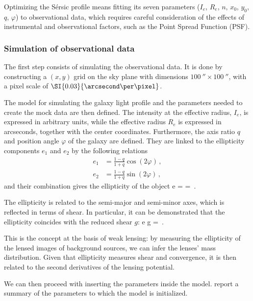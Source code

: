 Optimizing the Sérsic profile means fitting its seven parameters ($I_e$, $R_e$, $n$, $x_0$, $y_0$, $q$, $\varphi$) to observational data, which requires careful consideration of the effects of instrumental and observational factors, such as the Point Spread Function (PSF).

\subsubsection{Simulation of observational data}

The first step consists of simulating the observational data. It is done by constructing a $(x,y)$ grid on the sky plane with dimensions $\SI{100}{\arcsecond} \times \SI{100}{\arcsecond}$, with a pixel scale of $\SI{0.03}{\arcsecond\per\pixel}$.

The model for simulating the galaxy light profile and the parameters needed to create the mock data are then defined. The intensity at the effective radius, $I_e$, is expressed in arbitrary units, while the effective radius $R_e$ is expressed in arcseconds, together with the center coordinates. Furthermore, the axis ratio $q$ and position angle $\varphi$ of the galaxy are defined. They are linked to the ellipticity components $e_1$ and $e_2$ by the following relations
\begin{equation}
\begin{aligned}
    \label{eq:e1e2}
    e_1 & = \frac{1 - q}{1 + q} \cos{(2\varphi)} \,,
    \\
    e_2 & = \frac{1 - q}{1 + q} \sin{(2\varphi)}  \,,
\end{aligned}
\end{equation}
and their combination gives the ellipticity of the object
\be
\label{eq:ellip}
e =  =  \,.
\ee

The ellipticity is related to the semi-major and semi-minor axes, which is reflected in terms of shear. In particular, it can be demonstrated that the ellipticity coincides with the reduced shear $g$:
\be
\label{eq:red_shear}
e \equiv g =  \,.
\ee

This is the concept at the basis of weak lensing: by measuring the ellipticity of the lensed images of background sources, we can infer the lenses' mass distribution. Given that ellipticity measures shear and convergence, it is then related to the second derivatives of the lensing potential.


We can then proceed with inserting the parameters inside the model.  report a summary of the parameters to which the model is initialized.

